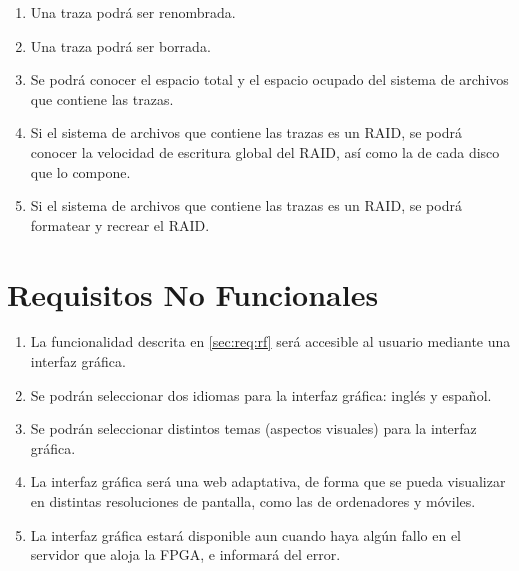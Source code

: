\begin{enumerate}[before=\itshape,font=\normalfont,label=\bfseries RF. \arabic*]
  \item Una \gls{traza} podrá ser renombrada.
  \item Una \gls{traza} podrá ser borrada.
  \item Se podrá conocer el espacio total y el espacio ocupado del sistema de archivos que contiene las \glspl{traza}.
  \item Si el sistema de archivos que contiene las \glspl{traza} es un \gls{RAID}, se podrá conocer la velocidad de escritura global del \gls{RAID}, así como la de cada disco que lo compone.
  \item Si el sistema de archivos que contiene las \glspl{traza} es un \gls{RAID}, se podrá formatear y recrear el \gls{RAID}.
\end{enumerate}


\section{Requisitos No Funcionales\label{sec:req:rnf}}

\begin{enumerate}[before=\itshape,font=\normalfont,label=\bfseries RNF. \arabic*]
  \setlength{\itemsep}{10pt}
  \setlength{\parskip}{10pt}
  \setlength{\parsep}{10pt}
  \item La funcionalidad descrita en \ref{sec:req:rf} será accesible al usuario mediante una interfaz gráfica.
  \item Se podrán seleccionar dos idiomas para la interfaz gráfica: inglés y español.
  \item Se podrán seleccionar distintos temas (aspectos visuales) para la interfaz gráfica.
  \item La interfaz gráfica será una web adaptativa, de forma que se pueda visualizar en distintas resoluciones de pantalla, como las de ordenadores y móviles.
  \item La interfaz gráfica estará disponible aun cuando haya algún fallo en el servidor que aloja la \gls{FPGA}, e informará del error.
\end{enumerate}